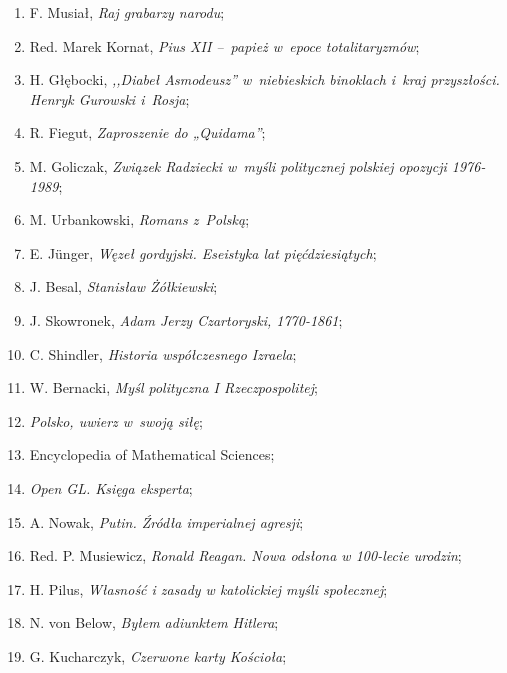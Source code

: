 \documentclass[a4paper,11pt]{article}
\begin{document}
\begin{enumerate}
\item F. Musiał, \emph{Raj grabarzy narodu};

\item Red. Marek Kornat, \emph{Pius XII --~papież w~epoce
    totalitaryzmów};

\item H. Głębocki, \emph{,,Diabeł Asmodeusz'' w~niebieskich binoklach
    i~kraj przyszłości. Henryk Gurowski i~Rosja};

\item R. Fiegut, \emph{Zaproszenie do „Quidama”};

\item M. Goliczak, \emph{Związek Radziecki w~myśli politycznej
    polskiej opozycji 1976-1989};

\item M. Urbankowski, \emph{Romans z~Polską};

\item E. J\"{u}nger, \emph{Węzeł gordyjski. Eseistyka lat
    pięćdziesiątych};

\item J. Besal, \emph{Stanisław Żółkiewski};

\item J. Skowronek, \emph{Adam Jerzy Czartoryski, 1770-1861};

\item C. Shindler, \emph{Historia współczesnego Izraela};

\item W. Bernacki, \emph{Myśl polityczna I Rzeczpospolitej};

\item \emph{Polsko, uwierz w~swoją siłę};

\item Encyclopedia of Mathematical Sciences;

\item \emph{Open GL. Księga eksperta};

\item A. Nowak, \emph{Putin. Źródła imperialnej agresji};

\item Red. P. Musiewicz, \emph{Ronald Reagan. Nowa odsłona w 100-lecie
    urodzin};

\item H. Pilus, \emph{Własność i zasady w katolickiej myśli
    społecznej};

\item N. von Below, \emph{Byłem adiunktem Hitlera};

\item G. Kucharczyk, \emph{Czerwone karty Kościoła};


\end{enumerate}
\end{document}
